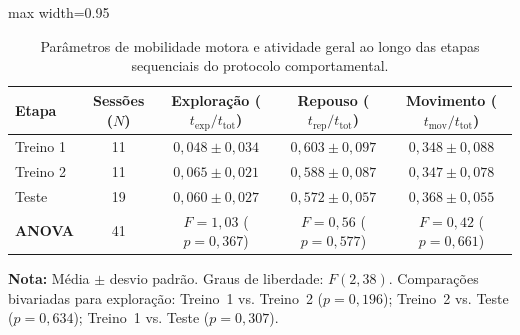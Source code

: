 \begin{table}[tbp]
    \centering
    \small
    \setlength{\tabcolsep}{4.5pt}
    \caption{Parâmetros de mobilidade motora e atividade geral ao longo das etapas sequenciais do protocolo comportamental.}
    \label{tab:estatistica_etapas_movimento}
    \begin{adjustbox}{max width=0.95\textwidth}
        \begin{tabular}{lcccc}
            \toprule
            \textbf{Etapa} & \textbf{Sessões ($N$)} & \textbf{Exploração ($t_{\text{exp}}/t_{\text{tot}}$)} & \textbf{Repouso ($t_{\text{rep}}/t_{\text{tot}}$)} & \textbf{Movimento ($t_{\text{mov}}/t_{\text{tot}}$)} \\
            \midrule
            Treino 1       & 11                     & $0{,}048 \pm 0{,}034$                                 & $0{,}603 \pm 0{,}097$                              & $0{,}348 \pm 0{,}088$                                \\
            Treino 2       & 11                     & $0{,}065 \pm 0{,}021$                                 & $0{,}588 \pm 0{,}087$                              & $0{,}347 \pm 0{,}078$                                \\
            Teste          & 19                     & $0{,}060 \pm 0{,}027$                                 & $0{,}572 \pm 0{,}057$                              & $0{,}368 \pm 0{,}055$                                \\
            \midrule
            \textbf{ANOVA} & 41                     & $F = 1{,}03$ ($p = 0{,}367$)                          & $F = 0{,}56$ ($p = 0{,}577$)                       & $F = 0{,}42$ ($p = 0{,}661$)                         \\
            \bottomrule
        \end{tabular}
    \end{adjustbox}
    \vspace{0.2em}
    \begin{minipage}{0.95\textwidth}
        \footnotesize \textbf{Nota:} Média $\pm$ desvio padrão. Graus de liberdade: $F(2, 38)$. Comparações bivariadas para exploração: Treino~1 vs. Treino~2 ($p = 0{,}196$); Treino~2 vs. Teste ($p = 0{,}634$); Treino~1 vs. Teste ($p = 0{,}307$).
    \end{minipage}
\end{table}
